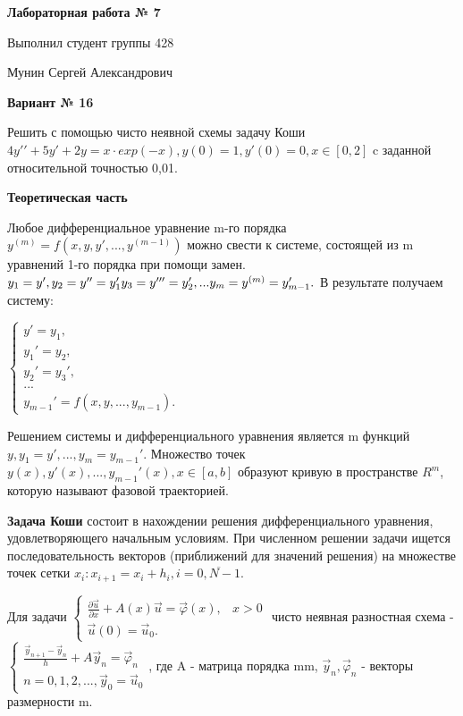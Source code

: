 \documentclass{article}
\begin{document}
\huge
\textbf{Лабораторная работа № 7}
\Large

Выполнил студент группы 428

Мунин Сергей Александрович

\LARGE
\textbf{Вариант № 16}

\Large
Решить с помощью чисто неявной схемы задачу Коши \( 4y′′+ 5y′+ 2y=x·exp(−x),  y(0)=1,{y}'(0)=0,x\in [0,2]\)
c заданной относительной точностью 0,01.

\LARGE
\textbf{Теоретическая часть}

\Large
Любое дифференциальное уравнение  m-го порядка \(y^{(m)}=f(x,y,y',...,y^{(m-1)})\) можно свести к системе, состоящей из m уравнений 1-го порядка при помощи замен. 
\(\\y_{1}=y',\\
y_{2}=y''=y_{1}'\\
y_{3}=y'''=y_{2}',\\
...\\
y_{m}=y^{(m)}=y_{m-1}'.\\
\)
В результате получаем систему:

\(\begin{cases}
 y'=y_{1}, \\ 
 y_{1}'=y_{2},\\ 
 y_{2}'=y_{3}', \\ 
 ... \\ 
 y_{m-1}'=f(x,y,...,y_{m-1}). 
\end{cases} \)

Решением системы и дифференциального уравнения является m функций 
\(y, y_{1}=y',...,y_{m}=y_{m-1}'\). Множество точек \(y(x),y'(x),...,y_{m-1}'(x),x\in [a,b]\) образуют кривую в пространстве \(R^m\), которую называют фазовой траекторией.

\textbf{Задача Коши} состоит в нахождении решения дифференциального уравнения, удовлетворяющего начальным условиям. При численном решении задачи ищется последовательность векторов (приближений для значений решения) на множестве точек сетки \(x_{i}:x_{i+1}=x_{i}+h_{i}, i=\overline{0,N-1}. \)

Для задачи 
\( \begin{cases}
 \frac{\partial \vec{u}}{\partial x}+A(x)\vec{u}=\vec{\varphi} (x),& x>0 \\ 
 \vec{u}(0)=\vec{u}_{0}. 
\end{cases} \) чисто неявная разностная схема - 
\(\begin{cases}
 \frac{\vec{y}_{n+1}-\vec{y}_{n}}{h}+A\vec{y}_{n}=\vec{\varphi}_{n}\\ 
n=0,1,2,..., \vec{y}_{0}=\vec{u}_{0} 
\end{cases} \), где A - матрица порядка m\times m, \(\vec{y}_{n},\vec{\varphi}_{n}\) - векторы размерности m.
\end{document}
